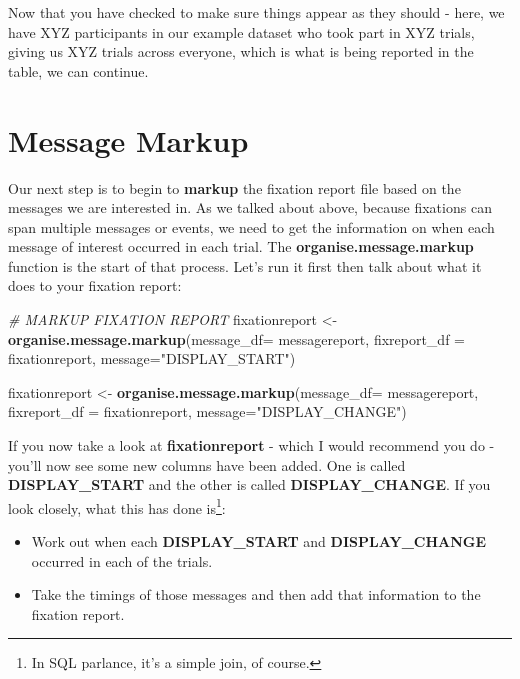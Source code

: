 \documentclass[]{book}
\newenvironment{Shaded}{\begin{snugshade}}{\end{snugshade}}
\newcommand{\CommentTok}[1]{\textcolor[rgb]{0.56,0.35,0.01}{\textit{#1}}}
\newcommand{\DataTypeTok}[1]{\textcolor[rgb]{0.13,0.29,0.53}{#1}}
\newcommand{\KeywordTok}[1]{\textcolor[rgb]{0.13,0.29,0.53}{\textbf{#1}}}
\newcommand{\NormalTok}[1]{#1}
\newcommand{\StringTok}[1]{\textcolor[rgb]{0.31,0.60,0.02}{#1}}
\providecommand{\tightlist}{%
  \setlength{\itemsep}{0pt}\setlength{\parskip}{0pt}}
\let\rmarkdownfootnote\footnote%
\def\footnote{\protect\rmarkdownfootnote}
\begin{document}
Now that you have checked to make sure things appear as they should - here, we have XYZ participants in our example dataset who took part in XYZ trials, giving us XYZ trials across everyone, which is what is being reported in the table, we can continue.

\hypertarget{message-markup}{%
\section{Message Markup}\label{message-markup}}

Our next step is to begin to \textbf{markup} the fixation report file based on the messages we are interested in. As we talked about above, because fixations can span multiple messages or events, we need to get the information on when each message of interest occurred in each trial. The \textbf{organise.message.markup} function is the start of that process. Let's run it first then talk about what it does to your fixation report:

\begin{Shaded}
\begin{Highlighting}[]
\CommentTok{# MARKUP FIXATION REPORT}
\NormalTok{fixationreport <-}\StringTok{ }\KeywordTok{organise.message.markup}\NormalTok{(}\DataTypeTok{message_df=}\NormalTok{ messagereport, }
                                     \DataTypeTok{fixreport_df =}\NormalTok{ fixationreport, }
                                     \DataTypeTok{message=}\StringTok{"DISPLAY_START"}\NormalTok{)}

\NormalTok{fixationreport <-}\StringTok{ }\KeywordTok{organise.message.markup}\NormalTok{(}\DataTypeTok{message_df=}\NormalTok{ messagereport, }
                                     \DataTypeTok{fixreport_df =}\NormalTok{ fixationreport, }
                                     \DataTypeTok{message=}\StringTok{"DISPLAY_CHANGE"}\NormalTok{)}
\end{Highlighting}
\end{Shaded}

If you now take a look at \textbf{fixationreport} - which I would recommend you do - you'll now see some new columns have been added. One is called \textbf{DISPLAY\_START} and the other is called \textbf{DISPLAY\_CHANGE}. If you look closely, what this has done is\footnote{In SQL parlance, it's a simple join, of course.}:

\begin{itemize}
\tightlist
\item
  Work out when each \textbf{DISPLAY\_START} and \textbf{DISPLAY\_CHANGE} occurred in each of the trials.
\item
  Take the timings of those messages and then add that information to the fixation report.
\end{itemize}
\end{document}
